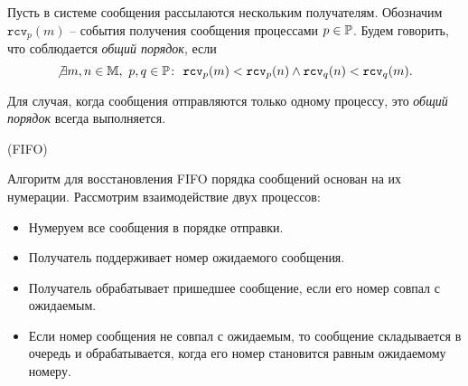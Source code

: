 \begin{definition}
    Пусть в системе сообщения рассылаются нескольким получателям.
    Обозначим $\texttt{rcv}_p(m)$ -- события получения сообщения процессами
    $p \in \mathbb{P}$. Будем говорить, что соблюдается \textit{общий порядок},
    если
    \[
        \not\exists m,n \in \mathbb{M},~ p,q \in \mathbb{P}\colon~
        \texttt{rcv}_p(m) < \texttt{rcv}_p(n) \wedge
        \texttt{rcv}_q(n) < \texttt{rcv}_q(m)
    .\]
\end{definition}

\begin{remark}
    Для случая, когда сообщения отправляются только одному процессу, это
    \textit{общий порядок} всегда выполняется.
\end{remark}

\begin{algorithm}(FIFO)

    Алгоритм для восстановления FIFO порядка сообщений основан на их нумерации. Рассмотрим взаимодействие двух процессов:
    \begin{itemize}
        \item Нумеруем все сообщения в порядке отправки.
        \item Получатель поддерживает номер ожидаемого сообщения.
        \item Получатель обрабатывает пришедшее сообщение, если его номер совпал с ожидаемым.
        \item Если номер сообщения не совпал с ожидаемым, то сообщение 
            складывается в очередь и обрабатывается, когда его номер становится 
            равным ожидаемому номеру.
    \end{itemize}
\end{algorithm}
